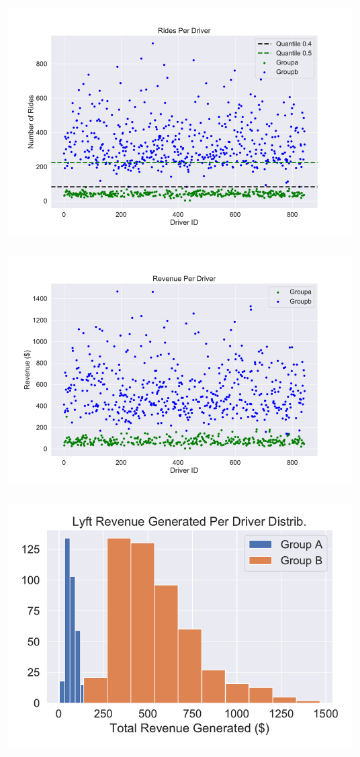 \documentclass{report}
\begin{document}
		\begin{figure}[!htb]
			\centering
			\begin{subfigure}[t]{0.32\textwidth}
				\includegraphics[width=\linewidth]{number_rides_per_driver.pdf}
				\caption{}
			\end{subfigure}
			\begin{subfigure}[t]{0.32\textwidth}
				\includegraphics[width=\linewidth]{revenue_per_driver.pdf}
				\caption{}
			\end{subfigure}
			\begin{subfigure}[t]{0.32\textwidth}
				\includegraphics[width=\linewidth]{total_revenue_generated_perdriver_bimodal.pdf}

\end{subfigure}
\end{figure}
\end{document}
